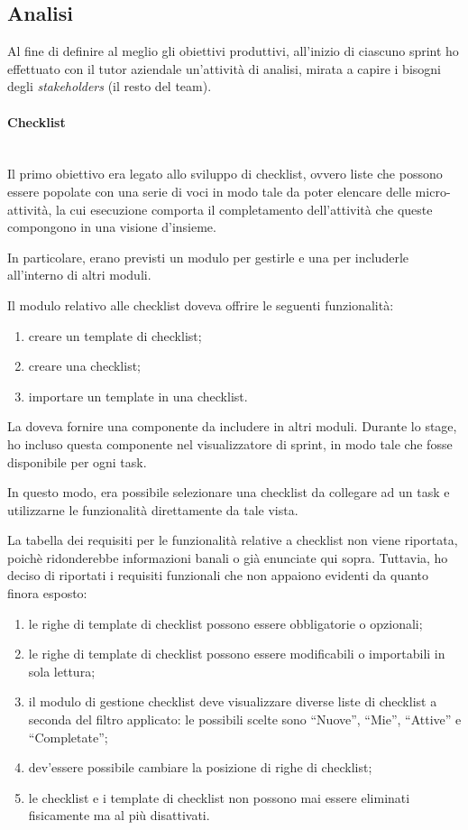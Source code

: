 \subsection{Analisi}

Al fine di definire al meglio gli obiettivi produttivi, all'inizio di ciascuno
sprint ho effettuato con il tutor aziendale un'attività di analisi, mirata a
capire i bisogni degli \emph{stakeholders} (il resto del team).

\paragraph{Checklist} \mbox{} \\

Il primo obiettivo era legato allo sviluppo di checklist, ovvero liste che
possono essere popolate con una serie di voci in modo tale da poter elencare
delle micro-attività, la cui esecuzione comporta il completamento
dell'attività che queste compongono in una visione d'insieme.

In particolare, erano previsti un modulo per gestirle e una 
per includerle all'interno di altri moduli.

Il modulo relativo alle checklist doveva offrire le seguenti funzionalità:

\begin{enumerate}
\item creare un template di checklist;
\item creare una checklist;
\item importare un template in una checklist.
\end{enumerate}

La  doveva fornire una componente da includere in altri
moduli. Durante lo stage, ho incluso questa componente nel visualizzatore di
sprint, in modo tale che fosse disponibile per ogni task.

In questo modo, era possibile selezionare una checklist da collegare ad un
task e utilizzarne le funzionalità direttamente da tale vista.

La tabella dei requisiti per le funzionalità relative a checklist non viene
riportata, poichè ridonderebbe informazioni banali o già enunciate qui sopra.
Tuttavia, ho deciso di riportati i requisiti funzionali che non appaiono
evidenti da quanto finora esposto:

\begin{enumerate}
\item le righe di template di checklist possono essere obbligatorie o
  opzionali;
\item le righe di template di checklist possono essere modificabili o
  importabili in sola lettura;
\item il modulo di gestione checklist deve visualizzare diverse liste di
  checklist a seconda del filtro applicato: le possibili scelte sono
  ``Nuove'', ``Mie'', ``Attive'' e ``Completate'';
\item dev'essere possibile cambiare la posizione di righe di checklist;
\item le checklist e i template di checklist non possono mai essere eliminati
  fisicamente ma al più disattivati.
\end{enumerate}

